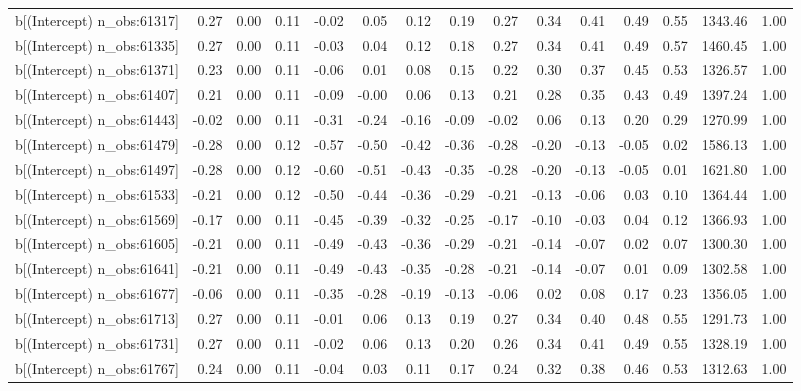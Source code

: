\begin{table}[ht]
\begin{tabular}{rrrrrrrrrrrrrrr}
  b[(Intercept) n\_obs:61317] & 0.27 & 0.00 & 0.11 & -0.02 & 0.05 & 0.12 & 0.19 & 0.27 & 0.34 & 0.41 & 0.49 & 0.55 & 1343.46 & 1.00 \\ 
  b[(Intercept) n\_obs:61335] & 0.27 & 0.00 & 0.11 & -0.03 & 0.04 & 0.12 & 0.18 & 0.27 & 0.34 & 0.41 & 0.49 & 0.57 & 1460.45 & 1.00 \\ 
  b[(Intercept) n\_obs:61371] & 0.23 & 0.00 & 0.11 & -0.06 & 0.01 & 0.08 & 0.15 & 0.22 & 0.30 & 0.37 & 0.45 & 0.53 & 1326.57 & 1.00 \\ 
  b[(Intercept) n\_obs:61407] & 0.21 & 0.00 & 0.11 & -0.09 & -0.00 & 0.06 & 0.13 & 0.21 & 0.28 & 0.35 & 0.43 & 0.49 & 1397.24 & 1.00 \\ 
  b[(Intercept) n\_obs:61443] & -0.02 & 0.00 & 0.11 & -0.31 & -0.24 & -0.16 & -0.09 & -0.02 & 0.06 & 0.13 & 0.20 & 0.29 & 1270.99 & 1.00 \\ 
  b[(Intercept) n\_obs:61479] & -0.28 & 0.00 & 0.12 & -0.57 & -0.50 & -0.42 & -0.36 & -0.28 & -0.20 & -0.13 & -0.05 & 0.02 & 1586.13 & 1.00 \\ 
  b[(Intercept) n\_obs:61497] & -0.28 & 0.00 & 0.12 & -0.60 & -0.51 & -0.43 & -0.35 & -0.28 & -0.20 & -0.13 & -0.05 & 0.01 & 1621.80 & 1.00 \\ 
  b[(Intercept) n\_obs:61533] & -0.21 & 0.00 & 0.12 & -0.50 & -0.44 & -0.36 & -0.29 & -0.21 & -0.13 & -0.06 & 0.03 & 0.10 & 1364.44 & 1.00 \\ 
  b[(Intercept) n\_obs:61569] & -0.17 & 0.00 & 0.11 & -0.45 & -0.39 & -0.32 & -0.25 & -0.17 & -0.10 & -0.03 & 0.04 & 0.12 & 1366.93 & 1.00 \\ 
  b[(Intercept) n\_obs:61605] & -0.21 & 0.00 & 0.11 & -0.49 & -0.43 & -0.36 & -0.29 & -0.21 & -0.14 & -0.07 & 0.02 & 0.07 & 1300.30 & 1.00 \\ 
  b[(Intercept) n\_obs:61641] & -0.21 & 0.00 & 0.11 & -0.49 & -0.43 & -0.35 & -0.28 & -0.21 & -0.14 & -0.07 & 0.01 & 0.09 & 1302.58 & 1.00 \\ 
  b[(Intercept) n\_obs:61677] & -0.06 & 0.00 & 0.11 & -0.35 & -0.28 & -0.19 & -0.13 & -0.06 & 0.02 & 0.08 & 0.17 & 0.23 & 1356.05 & 1.00 \\ 
  b[(Intercept) n\_obs:61713] & 0.27 & 0.00 & 0.11 & -0.01 & 0.06 & 0.13 & 0.19 & 0.27 & 0.34 & 0.40 & 0.48 & 0.55 & 1291.73 & 1.00 \\ 
  b[(Intercept) n\_obs:61731] & 0.27 & 0.00 & 0.11 & -0.02 & 0.06 & 0.13 & 0.20 & 0.26 & 0.34 & 0.41 & 0.49 & 0.55 & 1328.19 & 1.00 \\ 
  b[(Intercept) n\_obs:61767] & 0.24 & 0.00 & 0.11 & -0.04 & 0.03 & 0.11 & 0.17 & 0.24 & 0.32 & 0.38 & 0.46 & 0.53 & 1312.63 & 1.00 \\ 

\end{tabular}
\end{table}
